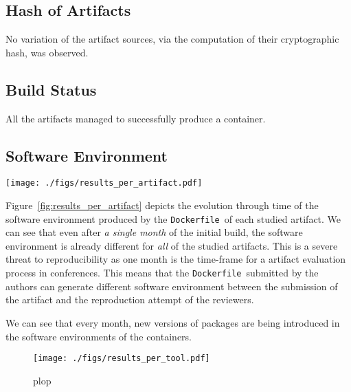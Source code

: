 \documentclass[sigconf,natbib=false]{acmart}
\newcommand{\df}{\texttt{Dockerfile}}
\newcommand{\todo}[1]{{\color{red}{TODO: #1}}}
\begin{document}
\subsection{Hash of Artifacts}

No variation of the artifact sources, via the computation of their cryptographic hash, was observed.

\subsection{Build Status}

All the artifacts managed to successfully produce a container.

\subsection{Software Environment}

\begin{figure*}
  \centering
  \texttt{[image: ./figs/results\_per\_artifact.pdf]}
  \caption{
    Evolution of the packages in the software environment of each container through time.
    Each container has been rebuilt once a month.
    The color of the bar corresponds to the month when a specific version of a package has been introduced in the software environment.
    We can see that the proportion of package versions similar to the versions in the initial build is decreasing throught the months.
  }
  \label{fig:results_per_artifact}
\end{figure*}

Figure~\ref{fig:results_per_artifact} depicts the evolution through time of the software environment produced by the \df\ of each studied artifact.
We can see that even after \emph{a single month} of the initial build, the software environment is already different for \emph{all} of the studied artifacts.
This is a severe threat to reproducibility as one month is the time-frame for a artifact evaluation process in conferences.
This means that the \df\ submitted by the authors can generate different software environment between the submission of the artifact and the reproduction attempt of the reviewers.


We can see that every month, new versions of packages are being introduced in the software environments of the containers.



\begin{figure}
  \centering
  \texttt{[image: ./figs/results\_per\_tool.pdf]}
  \caption{
    plop
  }\label{fig:results_per_tool}
\end{figure}
\end{document}
